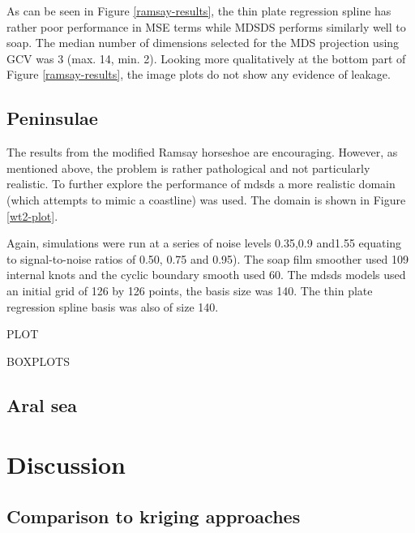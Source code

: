 \documentclass[useAMS,referee, usegraphicx]{biom}
\begin{document}
As can be seen in Figure \ref{ramsay-results}, the thin plate regression spline has rather poor performance in MSE terms while MDSDS performs similarly well to soap. The median number of dimensions selected for the MDS projection using GCV was 3 (max. 14, min. 2). Looking more qualitatively at the bottom part of Figure \ref{ramsay-results}, the image plots do not show any evidence of leakage.


\subsection{Peninsulae}

The results from the modified Ramsay horseshoe are encouraging. However, as mentioned above, the problem is rather pathological and not particularly realistic. To further explore the performance of mdsds a more realistic domain (which attempts to mimic a coastline) was used. The domain is shown in Figure \ref{wt2-plot}.

Again, simulations were run at a series of noise levels 0.35,0.9 and1.55 equating to signal-to-noise ratios of 0.50, 0.75 and 0.95). The soap film smoother used 109 internal knots and the cyclic boundary smooth used 60. The mdsds models used an initial grid of 126 by 126 points, the basis size was 140. The thin plate regression spline basis was also of size 140.

PLOT

BOXPLOTS


\subsection{Aral sea}


\section{Discussion}
\label{conclusion}





\subsection{Comparison to kriging approaches}
\end{document}
